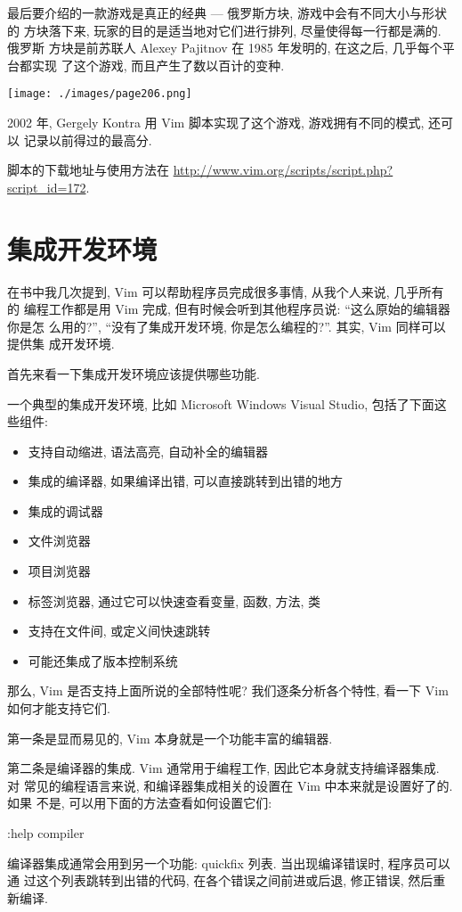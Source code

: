 最后要介绍的一款游戏是真正的经典 --- 俄罗斯方块, 游戏中会有不同大小与形状的
方块落下来, 玩家的目的是适当地对它们进行排列, 尽量使得每一行都是满的. 俄罗斯
方块是前苏联人 Alexey Pajitnov 在 1985 年发明的, 在这之后, 几乎每个平台都实现
了这个游戏, 而且产生了数以百计的变种.

\begin{center}
    \texttt{[image: ./images/page206.png]}
\end{center}

2002 年, Gergely Kontra 用 Vim 脚本实现了这个游戏, 游戏拥有不同的模式, 还可以
记录以前得过的最高分.

脚本的下载地址与使用方法在
\url{http://www.vim.org/scripts/script.php?script_id=172}.

\section{集成开发环境}
\label{sec:programmers_ide}

在书中我几次提到, Vim 可以帮助程序员完成很多事情, 从我个人来说, 几乎所有的
编程工作都是用 Vim 完成, 但有时候会听到其他程序员说: ``这么原始的编辑器你是怎
么用的?'', ``没有了集成开发环境, 你是怎么编程的?''. 其实, Vim 同样可以提供集
成开发环境.

首先来看一下集成开发环境应该提供哪些功能.

一个典型的集成开发环境, 比如 Microsoft Windows Visual Studio\textregistered,
包括了下面这些组件:
\begin{itemize}
    \item 支持自动缩进, 语法高亮, 自动补全的编辑器
    \item 集成的编译器, 如果编译出错, 可以直接跳转到出错的地方
    \item 集成的调试器
    \item 文件浏览器
    \item 项目浏览器
    \item 标签浏览器, 通过它可以快速查看变量, 函数, 方法, 类
    \item 支持在文件间, 或定义间快速跳转
    \item 可能还集成了版本控制系统
\end{itemize}
那么, Vim 是否支持上面所说的全部特性呢? 我们逐条分析各个特性, 看一下 Vim
如何才能支持它们.

第一条是显而易见的, Vim 本身就是一个功能丰富的编辑器.

第二条是编译器的集成. Vim 通常用于编程工作, 因此它本身就支持编译器集成. 对
常见的编程语言来说, 和编译器集成相关的设置在 Vim 中本来就是设置好了的. 如果
不是, 可以用下面的方法查看如何设置它们:
\begin{vimcode}
:help compiler
\end{vimcode}
编译器集成通常会用到另一个功能: quickfix 列表. 当出现编译错误时, 程序员可以通
过这个列表跳转到出错的代码, 在各个错误之间前进或后退, 修正错误, 然后重新编译.

